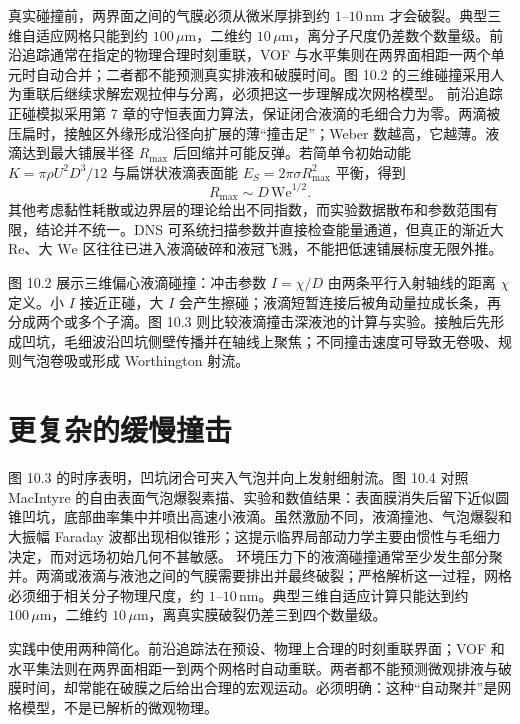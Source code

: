 \documentclass[11pt,a4paper,openany,fontset=none]{ctexbook}
\begin{document}
真实碰撞前，两界面之间的气膜必须从微米厚排到约 $1$--$10\,\mathrm{nm}$ 才会破裂。典型三维自适应网格只能到约 $100\,\mu\mathrm m$，二维约 $10\,\mu\mathrm m$，离分子尺度仍差数个数量级。前沿追踪通常在指定的物理合理时刻重联，VOF 与水平集则在两界面相距一两个单元时自动合并；二者都不能预测真实排液和破膜时间。图 10.2 的三维碰撞采用人为重联后继续求解宏观拉伸与分离，必须把这一步理解成次网格模型。
前沿追踪正碰模拟采用第 7 章的守恒表面力算法，保证闭合液滴的毛细合力为零。两滴被压扁时，接触区外缘形成沿径向扩展的薄“撞击足”；Weber 数越高，它越薄。液滴达到最大铺展半径 $R_{\max}$ 后回缩并可能反弹。若简单令初始动能
$K=\pi\rho U^2D^3/12$ 与扁饼状液滴表面能
$E_S=2\pi\sigma R_{\max}^2$ 平衡，得到
\begin{equation}
 R_{\max}\sim D\,\mathrm{We}^{1/2}.
\end{equation}
其他考虑黏性耗散或边界层的理论给出不同指数，而实验数据散布和参数范围有限，结论并不统一。DNS 可系统扫描参数并直接检查能量通道，但真正的渐近大 $\mathrm{Re}$、大 $\mathrm{We}$ 区往往已进入液滴破碎和液冠飞溅，不能把低速铺展标度无限外推。

图 10.2 展示三维偏心液滴碰撞：冲击参数 $I=\chi/D$ 由两条平行入射轴线的距离 $\chi$ 定义。小 $I$ 接近正碰，大 $I$ 会产生擦碰；液滴短暂连接后被角动量拉成长条，再分成两个或多个子滴。图 10.3 则比较液滴撞击深液池的计算与实验。接触后先形成凹坑，毛细波沿凹坑侧壁传播并在轴线上聚焦；不同撞击速度可导致无卷吸、规则气泡卷吸或形成 Worthington 射流。
\section{更复杂的缓慢撞击}

图 10.3 的时序表明，凹坑闭合可夹入气泡并向上发射细射流。图 10.4 对照 MacIntyre 的自由表面气泡爆裂素描、实验和数值结果：表面膜消失后留下近似圆锥凹坑，底部曲率集中并喷出高速小液滴。虽然激励不同，液滴撞池、气泡爆裂和大振幅 Faraday 波都出现相似锥形；这提示临界局部动力学主要由惯性与毛细力决定，而对远场初始几何不甚敏感。
环境压力下的液滴碰撞通常至少发生部分聚并。两滴或液滴与液池之间的气膜需要排出并最终破裂；严格解析这一过程，网格必须细于相关分子物理尺度，约 $1$--$10\,\mathrm{nm}$。典型三维自适应计算只能达到约 $100\,\mu\mathrm m$，二维约 $10\,\mu\mathrm m$，离真实膜破裂仍差三到四个数量级。

实践中使用两种简化。前沿追踪法在预设、物理上合理的时刻重联界面；VOF 和水平集法则在两界面相距一到两个网格时自动重联。两者都不能预测微观排液与破膜时间，却常能在破膜之后给出合理的宏观运动。必须明确：这种“自动聚并”是网格模型，不是已解析的微观物理。
\end{document}
